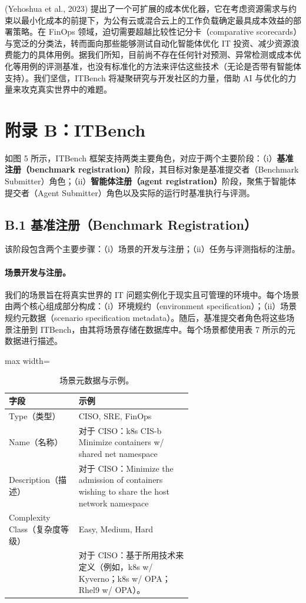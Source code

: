(Yehoshua et al., 2023) 提出了一个可扩展的成本优化器，它在考虑资源需求与约束以最小化成本的前提下，为公有云或混合云上的工作负载确定最具成本效益的部署策略。在 FinOps 领域，迫切需要超越比较性记分卡（comparative scorecards）与宽泛的分类法，转而面向那些能够测试自动化智能体优化 IT 投资、减少资源浪费能力的具体用例。据我们所知，目前尚不存在任何针对预测、异常检测或成本优化等用例的评测基准，也没有标准化的方法来评估这些技术（无论是否带有智能体支持）。我们坚信，ITBench 将凝聚研究与开发社区的力量，借助 AI 与优化的力量来攻克真实世界中的难题。

\section{附录 B：ITBench}

如图 5 所示，ITBench 框架支持两类主要角色，对应于两个主要阶段：（i）\textbf{基准注册（benchmark registration）}阶段，其目标对象是基准提交者（Benchmark Submitter）角色；（ii）\textbf{智能体注册（agent registration）}阶段，聚焦于智能体提交者（Agent Submitter）角色以及实际的运行时基准执行与评测。

\subsection{B.1 基准注册（Benchmark Registration）}

该阶段包含两个主要步骤：（i）场景的开发与注册；（ii）任务与评测指标的注册。

\paragraph{场景开发与注册。}
我们的场景旨在将真实世界的 IT 问题实例化于现实且可管理的环境中。每个场景由两个核心组成部分构成：（i）环境规约（environment specification）；（ii）场景规约元数据（scenario specification metadata）。随后，基准提交者角色将这些场景注册到 ITBench，由其将场景存储在数据库中。每个场景都使用表 7 所示的元数据进行描述。

\begin{table}[H]
\centering
\caption{场景元数据与示例。}
\label{tab:7}
\begin{adjustbox}{max width=\linewidth}
\begin{tabular}{@{}lp{0.62\linewidth}@{}}
\toprule
\textbf{字段} & \textbf{示例} \\
\midrule
Type（类型） & CISO, SRE, FinOps \\
Name（名称） & 对于 CISO：k8s CIS-b Minimize containers w/ shared net namespace \\
Description（描述） & 对于 CISO：Minimize the admission of containers wishing to share the host network namespace \\
Complexity Class（复杂度等级） & Easy, Medium, Hard \\
 & 对于 CISO：基于所用技术来定义（例如，k8s w/ Kyverno；k8s w/ OPA；Rhel9 w/ OPA）。\\
\bottomrule
\end{tabular}
\end{adjustbox}
\end{table}

